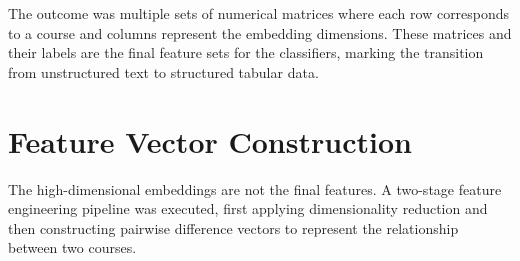 \begin{table}[!bt]
    \captionsetup{skip=5pt}
    \caption{Embedding Models \& PCA Explained Variance}
    \centering
    \label{tbl:emb}
\end{table}

The outcome was multiple sets of numerical matrices where each row corresponds to a course and columns represent the embedding dimensions. These matrices and their labels are the final feature sets for the classifiers, marking the transition from unstructured text to structured tabular data.

\section{Feature Vector Construction}\label{ch:3.5}
The high-dimensional embeddings are not the final features. A two-stage feature engineering pipeline was executed, first applying dimensionality reduction and then constructing pairwise difference vectors to represent the relationship between two courses.

